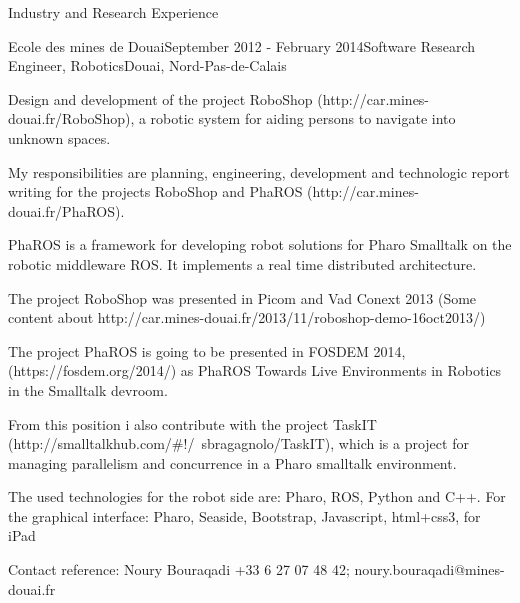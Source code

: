 \documentclass{resume} %
\begin{document}
\begin{rSection}{Industry and Research Experience}
\begin{rSubsection}{Ecole des mines de Douai}{September 2012 - February 2014}{Software Research Engineer, Robotics}{Douai, Nord-Pas-de-Calais}
	\item Design and development of the project RoboShop (http://car.mines-douai.fr/RoboShop), a robotic system for aiding persons to navigate into unknown spaces.
	\item My responsibilities are planning, engineering, development and technologic report writing for the projects RoboShop and PhaROS (http://car.mines-douai.fr/PhaROS). 
	\item PhaROS is a framework for developing robot solutions for Pharo Smalltalk on the robotic middleware ROS. It implements a real time distributed architecture.
	\item The project RoboShop was presented in Picom and Vad Conext 2013 (Some content about http://car.mines-douai.fr/2013/11/roboshop-demo-16oct2013/) 
	\item The project PhaROS is going to be presented in FOSDEM 2014, (https://fosdem.org/2014/) as PhaROS Towards Live Environments in Robotics in the Smalltalk devroom.
	\item From this position i also contribute with the project TaskIT (http://smalltalkhub.com/\#!/~sbragagnolo/TaskIT), which is a project for managing parallelism and concurrence in a Pharo smalltalk environment.
	\item The used technologies for the robot side are: Pharo, ROS, Python and C++. For the graphical interface: Pharo, Seaside, Bootstrap, Javascript, html+css3, for iPad
		\item Contact reference: Noury Bouraqadi +33 6 27 07 48 42; noury.bouraqadi@mines-douai.fr
\end{rSubsection}




\end{rSection}
\end{document}
